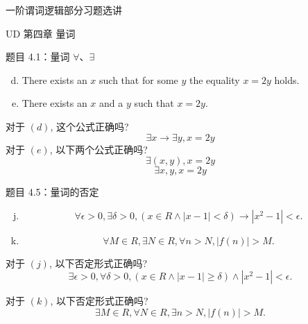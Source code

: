\begin{frame}{}
  \centerline{\LARGE 一阶谓词逻辑部分习题选讲}
  \vspace{0.50cm}
  \centerline{\large UD 第四章 \; 量词}
\end{frame}

\begin{frame}{}
  \begin{exampleblock}{题目 4.1：量词 $\forall$、$\exists$}
    \begin{enumerate}[(a)]
      \setcounter{enumi}{3}
      \item There exists an $x$ such that for some $y$ the equality $x = 2y$ holds.
      \item There exists an $x$ and a $y$ such that $x = 2y$.
    \end{enumerate}
  \end{exampleblock}

  \vspace{0.60cm}
  \pause
  对于 $(d)$, 这个公式正确吗?
  \[
    \exists x \to \exists y, x = 2y
  \]
  \pause
  对于 $(e)$, 以下两个公式正确吗?
  \[
    \exists (x,y), x = 2y
  \]
  \vspace{-0.30cm}
  \[
    \exists x, y, x = 2y
  \]
\end{frame}

\begin{frame}{}
  \begin{exampleblock}{题目 4.5：量词的否定}
    \begin{enumerate}[(a)]
      \setcounter{enumi}{9}
      \item 
	\[
	  \forall \epsilon > 0, \exists \delta > 0, (x \in R \land |x - 1| < \delta) \to |x^2 - 1| < \epsilon.
	\]
      \item
	\[
	  \forall M \in R, \exists N \in R, \forall n > N, |f(n)| > M.
	\]
    \end{enumerate}
  \end{exampleblock}

  \vspace{0.50cm}
  \pause
  对于 $(j)$, 以下否定形式正确吗?
  \[
      \exists \epsilon > 0, \forall \delta > 0, (x \in R \land |x - 1| \ge \delta) \land |x^2 - 1| < \epsilon.
  \]

  \pause
  对于 $(k)$, 以下否定形式正确吗?
  \[
    \exists M \in R, \forall N \in R, \exists n > N, |f(n)| > M.
  \]
\end{frame}

